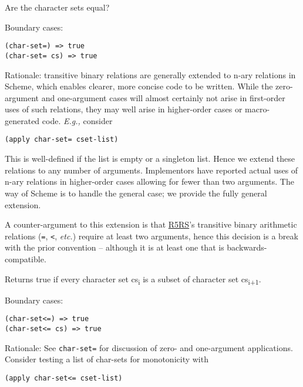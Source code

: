 \begin{entry}{%
  }

  Are the character sets equal?

  Boundary cases:

\begin{verbatim}
(char-set=) => true
(char-set= cs) => true
\end{verbatim}

  Rationale: transitive binary relations are generally extended to
  n-ary relations in Scheme, which enables clearer, more concise code
  to be written. While the zero-argument and one-argument cases will
  almost certainly not arise in first-order uses of such relations,
  they may well arise in higher-order cases or macro-generated
  code. \emph{E.g.,} consider

\begin{verbatim}
(apply char-set= cset-list)
\end{verbatim}

  This is well-defined if the list is empty or a singleton list. Hence
  we extend these relations to any number of arguments. Implementors
  have reported actual uses of n-ary relations in higher-order cases
  allowing for fewer than two arguments. The way of Scheme is to
  handle the general case; we provide the fully general extension.

  A counter-argument to this extension is that
  \protect\hyperlink{R5RS}{R5RS}'s transitive binary arithmetic
  relations (\texttt{=}, \texttt{<}, \emph{etc.}) require at
  least two arguments, hence this decision is a break with the prior
  convention -- although it is at least one that is
  backwards-compatible.
\end{entry}
\begin{entry}{%
  }

  Returns true if every character set
  cs\textsubscript{i} is a subset of character set
  cs\textsubscript{i+1}.

  Boundary cases:

\begin{verbatim}
(char-set<=) => true
(char-set<= cs) => true
\end{verbatim}

  Rationale: See \texttt{char-set=} for discussion of zero- and
  one-argument applications. Consider testing a list of char-sets for
  monotonicity with

\begin{verbatim}
(apply char-set<= cset-list)
\end{verbatim}
\end{entry}
